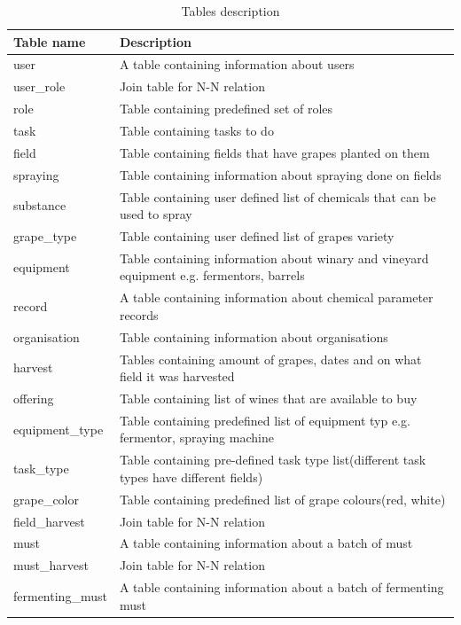 \begin{longtable}{|m{}|m{}|}
	\caption{Tables description}
	\label{tab:tables_description}\\[-1.5ex]
	\hline
	Table name & Description \\
	\hline
	\endfirsthead
	user & A table containing information about users\\
	\hline
	user\_role & Join table for N-N relation\\
	\hline
	role & Table containing predefined set of roles\\
	\hline
	task & Table containing tasks to do\\
	\hline
	field & Table containing fields that have grapes planted on them\\
	\hline
	spraying & Table containing information about spraying done on fields\\
	\hline
	substance & Table containing user defined list of chemicals that can be used to spray\\
	\hline
	grape\_type & Table containing user defined list of grapes variety\\
	\hline
	equipment & Table containing information about winary and vineyard equipment e.g. fermentors, barrels \\
	\hline
	record & A table containing information about chemical parameter records\\
	\hline
	organisation & Table containing information about organisations\\
	\hline
	harvest & Tables containing amount of grapes, dates and on what field it was harvested\\
	\hline
	offering & Table containing list of wines that are available to buy\\
	\hline
	equipment\_type & Table containing predefined list of equipment typ e.g. fermentor, spraying machine\\
	\hline
	task\_type & Table containing pre-defined task type list(different task types have different fields)\\
	\hline
	grape\_color & Table containing predefined list of grape colours(red, white)\\
	\hline
	field\_harvest & Join table for N-N relation\\
	\hline
	must & A table containing information about a batch of must\\
	\hline
	must\_harvest & Join table for N-N relation\\
	\hline
	fermenting\_must & A table containing information about a batch of fermenting must\\

\end{longtable}
